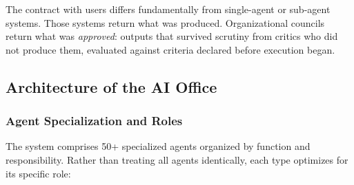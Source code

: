 \documentclass[sigconf]{acmart}
\begin{document}
The contract with users differs fundamentally from single-agent or sub-agent systems. Those systems return what was produced. Organizational councils return what was \textit{approved}: outputs that survived scrutiny from critics who did not produce them, evaluated against criteria declared before execution began.

\subsection{Architecture of the AI Office}
\label{sec:office-architecture}

\subsubsection{Agent Specialization and Roles}

The system comprises 50+ specialized agents organized by function and responsibility. Rather than treating all agents identically, each type optimizes for its specific role:
\end{document}
